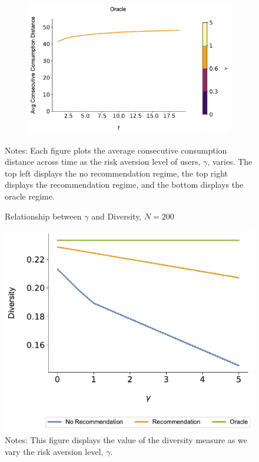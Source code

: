 \documentclass[format=acmsmall, review=true]{acmart}
\begin{document}
\begin{figure}[H]
\begin{subfigure}{.45\textwidth}
\end{subfigure}\\
\begin{subfigure}{.45\textwidth}
\includegraphics[width=\linewidth]{figures/gamma_consumption_dist_N_200T_20_omni.pdf}\\
\end{subfigure}%
\caption*{\scriptsize Notes: Each figure plots the average consecutive consumption distance across time as the risk aversion level of users, $\gamma$, varies. The top left displays the no recommendation regime, the top right displays the recommendation regime, and the bottom displays the oracle regime.}
\label{fig:no_rec_risk_aversion}
\end{figure}
\addtocounter{figure}{-1}

\begin{figure}[ht]
\caption{Relationship between $\gamma$ and Diversity, $N = 200$}
\includegraphics[width=.45\linewidth]{figures/gamma_diversity_N_200_T_20}
\caption*{\scriptsize Notes: This figure displays the value of the diversity measure as we vary the risk aversion level, $\gamma$.}\label{fig:cor_homo}
\end{figure}
\end{document}
